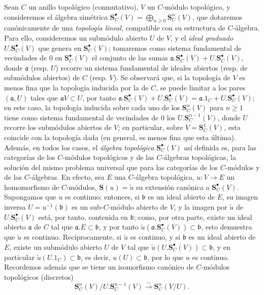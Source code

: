 \begin{env}[19.5.1]
\label{0.19.5.1-fr}

Sean $C$ un anillo topológico (conmutativo), $V$ un $C$-módulo topológico,
y consideremos el álgebra simétrica
$\mathbf S_C^\bullet(V)=\bigoplus_{n\geq0}\mathbf S_C^n(V)$, que dotaremos
canónicamente de una \emph{topología lineal}, compatible con su estructura de
$C$-álgebra. Para ello, consideremos un submódulo abierto $U$ de $V$, y
el \emph{ideal graduado} $U.\mathbf S_C^\bullet(V)$ que genera en
$\mathbf S_C^\bullet(V)$; tomaremos como sistema fundamental de vecindades de
$0$ en $\mathbf S_C^\bullet(V)$ el conjunto de las sumas
$\mathfrak a.\mathbf S_C^\bullet(V)+U.\mathbf S_C^\bullet(V)$, donde $\mathfrak a$ (resp.
$U$) recorre un sistema fundamental de ideales abiertos (resp. de submódulos
abiertos) de $C$ (resp. $V$). Se observará que, si la topología de $V$ es menos
fina que la topología inducida por la de $C$, se puede limitar a los pares
$(\mathfrak a,U)$ tales que $\mathfrak aV\subset U$, por tanto
$\mathfrak a.\mathbf S_C^\bullet(V)+U.\mathbf S_C^\bullet(V)
=\mathfrak a.1_C+U.\mathbf S_C^\bullet(V)$; en este caso, la topología inducida sobre
cada uno de los $\mathbf S_C^n(V)$ para $n\geq1$ tiene como sistema fundamental de
vecindades de $0$ los $U.\mathbf S_C^{n-1}(V)$, donde $U$ recorre los
submódulos abiertos de $V$; en particular, sobre $V=\mathbf S_C^1(V)$, esta
coincide con la topología dada (en general, es menos fina que esta
última). Además, en todos los casos, el \emph{álgebra topológica}
$\mathbf S_C^\bullet(V)$ así definida es, para las categorías de los $C$-módulos
topológicos y de las $C$-álgebras topológicas, la solución del mismo problema
universal que para las categorías de los $C$-módulos y de las $C$-álgebras. En efecto,
sea $E$ una $C$-álgebra topológica, $u:V\to E$ un homomorfismo de
$C$-módulos, $\mathbf S(u)=\widetilde u$ su extensión canónica a
$\mathbf S_C^\bullet(V)$. Supongamos que $u$ es continuo; entonces, si $\mathfrak b$ es un
ideal abierto de $E$, su imagen inversa $U=u^{-1}(\mathfrak b)$ es un
sub-$C$-módulo abierto de $V$, y la imagen por $\widetilde u$ de
$U.\mathbf S_C^\bullet(V)$ está, por tanto, contenida en $\mathfrak b$; como, por otra parte,
existe un ideal abierto $\mathfrak a$ de $C$ tal que
$\mathfrak a.E\subset\mathfrak b$, y por tanto
$\widetilde u(\mathfrak a.\mathbf S_C^\bullet(V))\subset\mathfrak b$, esto demuestra
que $\widetilde u$ es continuo. Recíprocamente, si $\widetilde u$ es continuo,
y si $\mathfrak b$ es un ideal abierto de $E$, existe un submódulo abierto
$U$ de $V$ tal que $\widetilde u(U.\mathbf S_C^\bullet(V))\subset\mathfrak b$, y en
particular $\widetilde u(U.1_C)\subset\mathfrak b$, es decir,
$u(U)\subset\mathfrak b$, por lo que $u$ es continuo. Recordemos además que se tiene
un isomorfismo canónico de $C$-módulos topológicos (discretos)
\begin{equation}
\label{0.19.5.1.1-fr}
  \mathbf S_C^n(V)/U.\mathbf S_C^{n-1}(V)
  \xrightarrow{\sim}\mathbf S_C^n(V/U).
  \tag{19.5.1.1}
\end{equation}
\end{env}

